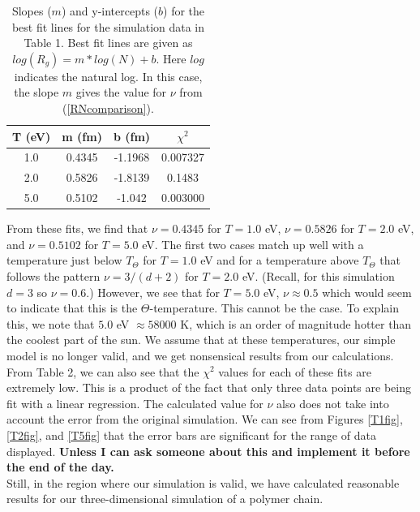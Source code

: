 \documentclass{article}
\begin{document}
\begin{multicols}{2}
\begin{table}
\begin{center}
\begin{tabular}{| c | c | c | c |}
\hline \textbf{T (eV)} & \textbf{m (fm)} & \textbf{b (fm)} & \textbf{$\chi ^2$} \\ \hline
1.0 & 0.4345 & -1.1968 & 0.007327 \\ \hline
2.0 & 0.5826 & -1.8139 & 0.1483 \\ \hline
5.0 & 0.5102 & -1.042 & 0.003000 \\ \hline
\end{tabular}
\caption{Slopes ($m$) and y-intercepts ($b$) for the best fit lines for the simulation data in Table 1.  Best fit lines are given as $log(R_g) = m*log(N) + b$.  Here $log$ indicates the natural log.  In this case, the slope $m$ gives the value for $\nu$ from (\ref{RNcomparison}).}
\end{center}
\end{table}

From these fits, we find that $\nu = 0.4345$ for $T=1.0$ eV, $\nu = 0.5826$ for $T = 2.0$ eV, and $\nu = 0.5102$ for $T = 5.0$ eV.  The first two cases match up well with a temperature just below $T_{\Theta}$ for $T=1.0$ eV and for a temperature above $T_{\Theta}$ that follows the pattern $\nu = 3/(d+2)$ for $T = 2.0$ eV.  (Recall, for this simulation $d=3$ so $\nu = 0.6$.)  However, we see that for $T = 5.0$ eV, $\nu \approx 0.5$ which would seem to indicate that this is the $\Theta$-temperature. This cannot be the case.  To explain this, we note that $5.0$ eV $\approx 58000$ K, which is an order of magnitude hotter than the coolest part of the sun.  \cite{sun}  We assume that at these temperatures, our simple model is no longer valid, and we get nonsensical results from our calculations.  \\

From Table 2, we can also see that the $\chi^2$ values for each of these fits are extremely low.  This is a product of the fact that only three data points are being fit with a linear regression.  The calculated value for $\nu$ also does not take into account the error from the original simulation.  We can see from Figures \ref{T1fig}, \ref{T2fig}, and \ref{T5fig} that the error bars are significant for the range of data displayed.  \textbf{Unless I can ask someone about this and implement it before the end of the day.} \\

Still, in the region where our simulation is valid, we have calculated reasonable results for our three-dimensional simulation of a polymer chain.  


\end{multicols}
\end{document}
